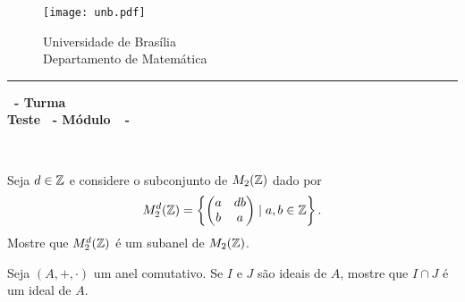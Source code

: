 \documentclass[12pt]{exam}
\begin{document}
    \begin{figure}[h]
        \begin{minipage}[c]{1.7cm}
            \texttt{[image: unb.pdf]}
        \end{minipage}
        \hspace{0pt}
        \begin{minipage}[c]{4in}
            {Universidade de Brasília} \\
            {Departamento de Matemática}
        \end{minipage}
    \end{figure}
    \hrule
    \begin{center}
        {\Large\bf \disciplina\ - Turma \turma}  \\
         {\large\bf Teste \numeroteste\ - Módulo\ \modulo\ -\ \dataavaliacao}
    \end{center}

    \\
    \vspace*{.01cm}


    \vspace{.4cm}


    \questao Seja $d \in \mathbb{Z}$ e considere o subconjunto de $M_2(\mathbb{Z})$ dado por
    \[
    M_2^d(\mathbb{Z}) = \left\{\begin{pmatrix} a & db \\ b & a \end{pmatrix} \mid a, b \in \mathbb{Z}\right\}.
    \]
    Mostre que $M_2^d(\mathbb{Z})$ é um subanel de $M_2(\mathbb{Z})$.

    \vspace{.4cm}

    \questao Seja $(A, +, \cdot)$ um anel comutativo. Se $I$ e $J$ são ideais de $A$, mostre que $I \cap J$ é um ideal de $A$.
\vspace{1cm}
\end{document}
